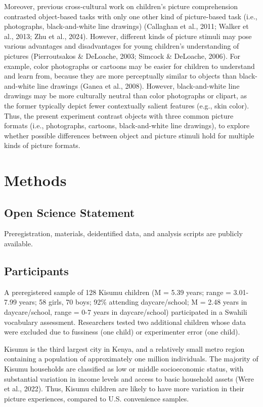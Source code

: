 \documentclass[10pt, letterpaper]{article}
\begin{document}
Moreover, previous cross-cultural work on children's picture
comprehension contrasted object-based tasks with only one other kind of
picture-based task (i.e., photographs, black-and-white line drawings)
(Callaghan et al., 2011; Walker et al., 2013; Zhu et al., 2024).
However, different kinds of picture stimuli may pose various advantages
and disadvantages for young children's understanding of pictures
(Pierroutsakos \& DeLoache, 2003; Simcock \& DeLoache, 2006). For
example, color photographs or cartoons may be easier for children to
understand and learn from, because they are more perceptually similar to
objects than black-and-white line drawings (Ganea et al., 2008).
However, black-and-white line drawings may be more culturally neutral
than color photographs or clipart, as the former typically depict fewer
contextually salient features (e.g., skin color). Thus, the present
experiment contrast objects with three common picture formats (i.e.,
photographs, cartoons, black-and-white line drawings), to explore
whether possible differences between object and picture stimuli hold for
multiple kinds of picture formats.

\section{Methods}\label{methods}

\subsection{Open Science Statement}\label{open-science-statement}

Preregistration, materials, deidentified data, and analysis scripts are
publicly available.

\subsection{Participants}\label{participants}

A preregistered sample of 128 Kisumu children (M = 5.39 years; range =
3.01-7.99 years; 58 girls, 70 boys; 92\% attending daycare/school; M =
2.48 years in daycare/school, range = 0-7 years in daycare/school)
participated in a Swahili vocabulary assessment. Researchers tested two
additional children whose data were excluded due to fussiness (one
child) or experimenter error (one child).

Kisumu is the third largest city in Kenya, and a relatively small metro
region containing a population of approximately one million individuals.
The majority of Kisumu households are classified as low or middle
socioeconomic status, with substantial variation in income levels and
access to basic household assets (Were et al., 2022). Thus, Kisumu
children are likely to have more variation in their picture experiences,
compared to U.S. convenience samples.
\end{document}

